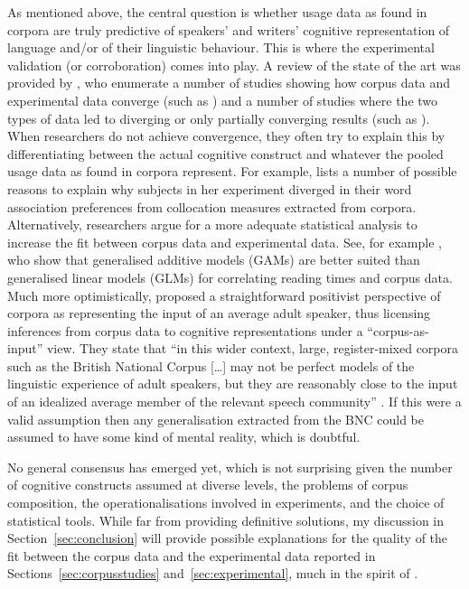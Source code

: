 As mentioned above, the central question is whether usage data as found in corpora are truly predictive of speakers' and writers' cognitive representation of language and\slash or of their linguistic behaviour.
This is where the experimental validation (or corroboration) comes into play.
A review of the state of the art was provided by \citet{NewmanSorensenduncan2015}, who enumerate a number of studies showing how corpus data and experimental data converge (such as \citealp{BresnanEa2007,DurrantDoherty2010,GriesWulff2005,GriesEa2005}) and a number of studies where the two types of data led to diverging or only partially converging results (such as \citealp{ArppeJaervikivi2007,Dabrowska2014,Mollin2009}).
When researchers do not achieve convergence, they often try to explain this by differentiating between the actual cognitive construct and whatever the pooled usage data as found in corpora represent.
For example, \citet[411]{Dabrowska2014} lists a number of possible reasons to explain why subjects in her experiment diverged in their word association preferences from collocation measures extracted from corpora.
Alternatively, researchers argue for a more adequate statistical analysis to increase the fit between corpus data and experimental data.
See, for example \citet{DivjakEa2016}, who show that generalised additive models (GAMs) are better suited than generalised linear models (GLMs) for correlating reading times and corpus data.
Much more optimistically, \citet{StefanowitschFlach2016} proposed a straightforward positivist perspective of corpora as representing the input of an average adult speaker, thus licensing inferences from corpus data to cognitive representations under a ``corpus-as-input'' view.
They state that ``in this wider context, large, register-mixed corpora such as the British National Corpus [\ldots] may not be perfect models of the linguistic experience of adult speakers, but they are reasonably close to the input of an idealized average member of the relevant speech community'' \citep[104]{StefanowitschFlach2016}.
If this were a valid assumption then any generalisation extracted from the BNC could be assumed to have some kind of mental reality, which is doubtful.

No general consensus has emerged yet, which is not surprising given the number of cognitive constructs assumed at diverse levels, the problems of corpus composition, the operationalisations involved in experiments, and the choice of statistical tools.
While far from providing definitive solutions, my discussion in Section~\ref{sec:conclusion} will provide possible explanations for the quality of the fit between the corpus data and the experimental data reported in Sections~\ref{sec:corpusstudies} and~\ref{sec:experimental}, much in the spirit of \citet{Dabrowska2014}.

